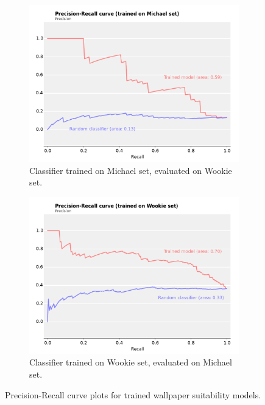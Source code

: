 \begin{figure}
\centering
\begin{subfigure}{0.79\columnwidth}
  \centering
  \includegraphics[width=0.99\columnwidth]{../figures/PRcurve_michael_wookie.pdf}
  \caption{Classifier trained on Michael set, evaluated on Wookie set.}
\end{subfigure}
\vskip8mm
\begin{subfigure}{0.79\columnwidth}
  \centering
  \includegraphics[width=0.99\columnwidth]{../figures/PRcurve_wookie_michael.pdf}
  \caption{Classifier trained on Wookie set, evaluated on Michael set.}
\end{subfigure}
\caption{Precision-Recall curve plots for trained wallpaper suitability models.\label{fig:PR}}
\end{figure}


